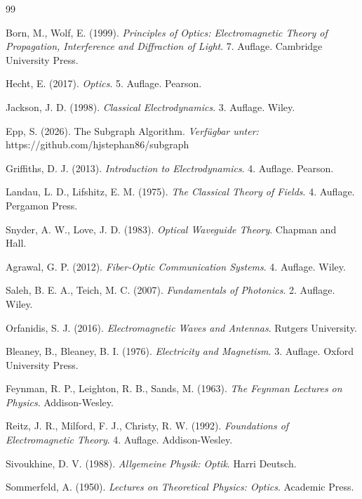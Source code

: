 \documentclass[12pt,a4paper,oneside]{article}
\theoremstyle{definition}
\theoremstyle{remark}
\begin{document}
\begin{thebibliography}{99}

Born, M., Wolf, E. (1999). \textit{Principles of Optics: Electromagnetic Theory of Propagation, Interference and Diffraction of Light}. 7. Auflage. Cambridge University Press.

Hecht, E. (2017). \textit{Optics}. 5. Auflage. Pearson.

Jackson, J. D. (1998). \textit{Classical Electrodynamics}. 3. Auflage. Wiley.

Epp, S. (2026). The Subgraph Algorithm. \textit{Verfügbar unter:} https://github.com/hjstephan86/subgraph

Griffiths, D. J. (2013). \textit{Introduction to Electrodynamics}. 4. Auflage. Pearson.

Landau, L. D., Lifshitz, E. M. (1975). \textit{The Classical Theory of Fields}. 4. Auflage. Pergamon Press.

Snyder, A. W., Love, J. D. (1983). \textit{Optical Waveguide Theory}. Chapman and Hall.

Agrawal, G. P. (2012). \textit{Fiber-Optic Communication Systems}. 4. Auflage. Wiley.

Saleh, B. E. A., Teich, M. C. (2007). \textit{Fundamentals of Photonics}. 2. Auflage. Wiley.

Orfanidis, S. J. (2016). \textit{Electromagnetic Waves and Antennas}. Rutgers University.

Bleaney, B., Bleaney, B. I. (1976). \textit{Electricity and Magnetism}. 3. Auflage. Oxford University Press.

Feynman, R. P., Leighton, R. B., Sands, M. (1963). \textit{The Feynman Lectures on Physics}. Addison-Wesley.

Reitz, J. R., Milford, F. J., Christy, R. W. (1992). \textit{Foundations of Electromagnetic Theory}. 4. Auflage. Addison-Wesley.

Sivoukhine, D. V. (1988). \textit{Allgemeine Physik: Optik}. Harri Deutsch.

Sommerfeld, A. (1950). \textit{Lectures on Theoretical Physics: Optics}. Academic Press.

\end{thebibliography}
\end{document}
